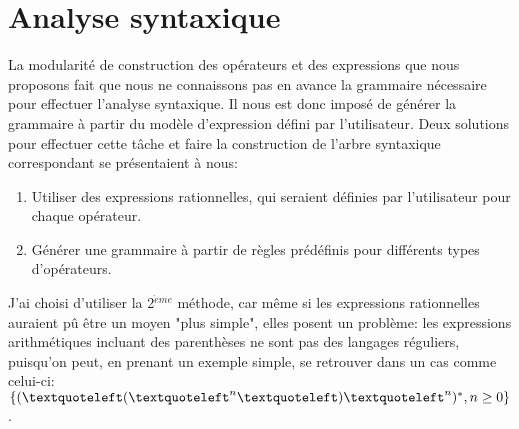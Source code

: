 \documentclass{article}
\begin{document}
\section{Analyse syntaxique}
La modularité de construction des opérateurs et des expressions que nous proposons fait que nous ne connaissons pas en avance la grammaire nécessaire pour effectuer l'analyse syntaxique. Il nous est donc imposé de générer la grammaire à partir du modèle d'expression défini par l'utilisateur.
Deux solutions pour effectuer cette tâche et faire la construction de l'arbre syntaxique correspondant se présentaient à nous:
\begin{enumerate}
	\item Utiliser des expressions rationnelles, qui seraient définies par l'utilisateur pour chaque opérateur.
	\item Générer une grammaire à partir de règles prédéfinis pour différents types d'opérateurs.
\end{enumerate}
J'ai choisi d'utiliser la 2$^{\grave{e}me}$ méthode, car même si les expressions rationnelles auraient pû être un moyen "plus simple", elles posent un problème: les expressions arithmétiques incluant des parenthèses ne sont pas des langages réguliers, puisqu'on peut, en prenant un exemple simple, se retrouver dans un cas comme celui-ci: $\{(\textquoteleft(\textquoteleft^{n}\textquoteleft)\textquoteleft^{n})^{*}, n \ge 0 \}$.
\end{document}
